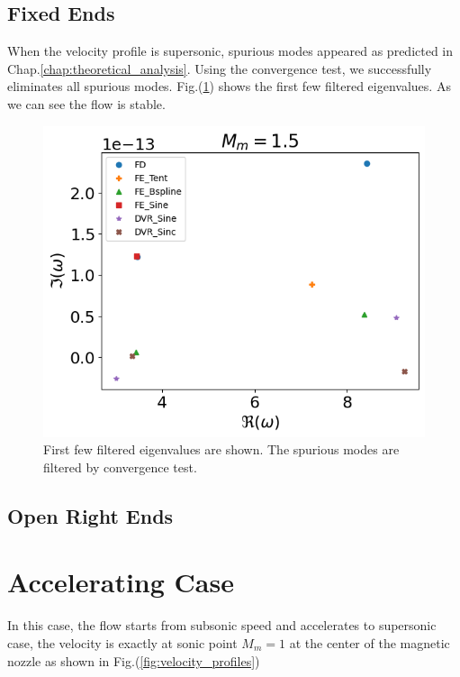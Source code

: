 \subsection{Fixed Ends}
When the velocity profile is supersonic, spurious modes appeared as predicted in Chap.\ref{chap:theoretical_analysis}. Using the convergence test, we successfully eliminates all spurious modes. Fig.(\ref{fig:supersonic_v}) shows the first few filtered eigenvalues. As we can see the flow is stable.
\begin{figure} [H]
	\centering
	\includegraphics[width=0.7\linewidth]{img/numerical_experiments/supersonic_v}
	\caption{First few filtered eigenvalues are shown. The spurious modes are filtered by convergence test.}
	\label{fig:supersonic_v}
\end{figure}

\subsection{Open Right Ends}


\section{Accelerating Case}
In this case, the flow starts from subsonic speed and accelerates to supersonic case, the velocity is exactly at sonic point $M_m=1$ at the center of the magnetic nozzle as shown in Fig.(\ref{fig:velocity_profiles})

